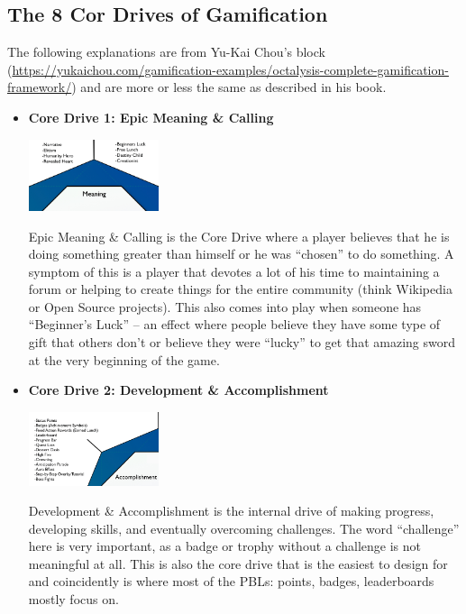 \subsection{The 8 Cor Drives of Gamification}
The following explanations are from Yu-Kai Chou's block (\url{https://yukaichou.com/gamification-examples/octalysis-complete-gamification-framework/}) and are more or less the same as described in his book.
\begin{itemize}
    \item \textbf{Core Drive 1: Epic Meaning \& Calling}
    \begin{center}
        \includegraphics[width= 0.3\textwidth]{images/core-drive-1-epic-meaning-and-calling.png}
    \end{center}
    Epic Meaning \& Calling is the Core Drive where a player believes that he is doing something greater than himself or he was “chosen” to do something. A symptom of this is a player that devotes a lot of his time to maintaining a forum or helping to create things for the entire community (think Wikipedia or Open Source projects). This also comes into play when someone has “Beginner’s Luck” – an effect where people believe they have some type of gift that others don’t or believe they were “lucky” to get that amazing sword at the very beginning of the game.
    
    \item \textbf{Core Drive 2: Development \& Accomplishment}
    \begin{center}
        \includegraphics[width= 0.3\textwidth]{images/core-drive-2-development-and-accomplishment.png}
    \end{center}
    Development \& Accomplishment is the internal drive of making progress, developing skills, and eventually overcoming challenges. The word “challenge” here is very important, as a badge or trophy without a challenge is not meaningful at all. This is also the core drive that is the easiest to design for and coincidently is where most of the PBLs: points, badges, leaderboards mostly focus on.
    

\end{itemize}

